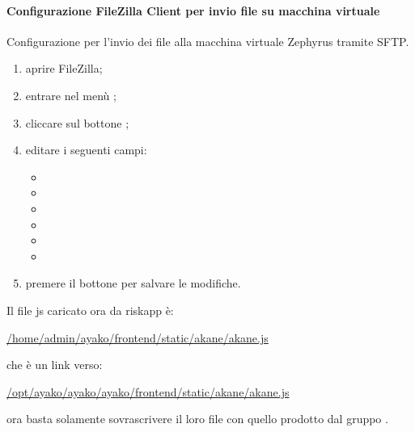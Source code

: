 	\paragraph{Configurazione FileZilla Client per invio file su macchina virtuale}
	Configurazione per l'invio dei file alla macchina virtuale Zephyrus tramite SFTP.
	\begin{enumerate}
		\item aprire FileZilla;
		\item entrare nel menù ;
		\item cliccare sul bottone ;
		\item editare i seguenti campi:
			\begin{itemize}
				\item {} 
				\item {}
				\item {}
				\item {}
				\item {}
				\item {}
			\end{itemize}
		\item premere il bottone  per salvare le modifiche.
	\end{enumerate}
	Il file js caricato ora da riskapp è:
	\begin{center}
		\url{/home/admin/ayako/frontend/static/akane/akane.js}
	\end{center}
	che è un link verso:
	\begin{center}
		\url{/opt/ayako/ayako/ayako/frontend/static/akane/akane.js}
	\end{center}
	ora basta solamente sovrascrivere il loro file con quello prodotto dal gruppo \zephyrus.
